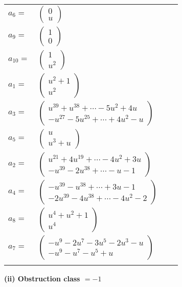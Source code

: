 \documentclass[1p]{elsarticle_modified}
\theoremstyle{definition}
\begin{document}
\begin{tabular}{m{7pt} m{180pt} m{7pt} m{180pt} }
\flushright $a_{6}=$&$\begin{pmatrix}0\\u\end{pmatrix}$ \\
\flushright $a_{9}=$&$\begin{pmatrix}1\\0\end{pmatrix}$ \\
\flushright $a_{10}=$&$\begin{pmatrix}1\\u^2\end{pmatrix}$ \\
\flushright $a_{1}=$&$\begin{pmatrix}u^2+1\\u^2\end{pmatrix}$ \\
\flushright $a_{3}=$&$\begin{pmatrix}u^{39}+u^{38}+\cdots-5 u^2+4 u\\- u^{27}-5 u^{25}+\cdots+4 u^2- u\end{pmatrix}$ \\
\flushright $a_{5}=$&$\begin{pmatrix}u\\u^3+u\end{pmatrix}$ \\
\flushright $a_{2}=$&$\begin{pmatrix}u^{21}+4 u^{19}+\cdots-4 u^2+3 u\\- u^{39}-2 u^{38}+\cdots- u-1\end{pmatrix}$ \\
\flushright $a_{4}=$&$\begin{pmatrix}- u^{39}- u^{38}+\cdots+3 u-1\\-2 u^{39}-4 u^{38}+\cdots-4 u^2-2\end{pmatrix}$ \\
\flushright $a_{8}=$&$\begin{pmatrix}u^4+u^2+1\\u^4\end{pmatrix}$ \\
\flushright $a_{7}=$&$\begin{pmatrix}- u^9-2 u^7-3 u^5-2 u^3- u\\- u^9- u^7- u^5+u\end{pmatrix}$\\&\end{tabular}
\flushleft \textbf{(ii) Obstruction class $= -1$}\\~\\
\end{document}
